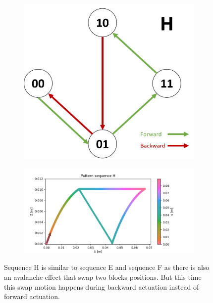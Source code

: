     \begin{figure}[h]
        \centering
        \begin{subfigure}{.2\textwidth}
        \includegraphics[width=\textwidth]{images/S_H.png}
        \end{subfigure}%
        \begin{subfigure}{.6\textwidth}
        \includegraphics[width=\textwidth]{images/H.png}
        \end{subfigure}
        \caption{Sequence H is similar to sequence E and sequence F as there is also an avalanche effect that swap two blocks positions. But this time this swap motion happens during backward actuation instead of forward actuation.}
        \label{fig:appendix_seq_H}
    \end{figure}

